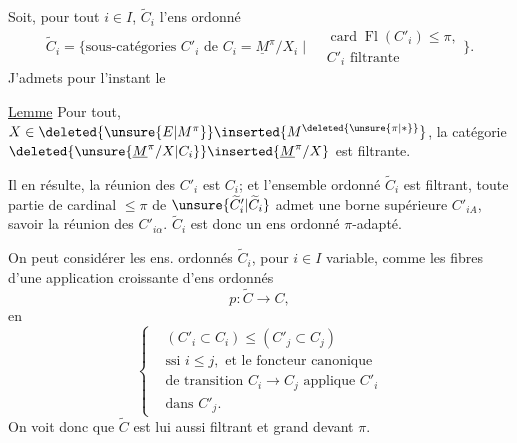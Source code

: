 Soit, pour tout $i\in I$, $\widetilde C_i$ l'ens ordonné
\[
\widetilde C_i=\{\text{sous-catégories }C'_i\text{ de }C_i=\underline M^{\pi}/X_i\mid
\begin{aligned}
&\operatorname{card}\operatorname{Fl}(C'_i)\leq\pi,\\
&C'_i\text{ filtrante}
\end{aligned}\}.
\]
J'admets pour l'instant le

\uline{Lemme} Pour  tout, $X\in\deleted{\unsure{E|M^{\pi}}}\inserted{M^{\deleted{\unsure{\pi|\ast}}}}$, la catégorie $\deleted{\unsure{\underline M^{\pi}/X|C_i}}\inserted{\underline M^{\pi}/X}$ est filtrante.

Il en résulte,  la réunion des $C'_i$  est $C_i$; et l'ensemble ordonné $\widetilde C_i$ est filtrant,  toute partie  de cardinal $\leq\pi$ de $\unsure{\widetilde C'_i|\widetilde C_i}$ admet une borne supérieure $C'_{iA}$, savoir la réunion des $C'_{i\alpha}$. $\widetilde C_i$ est donc un ens ordonné $\pi$-adapté. 

On peut considérer les ens. ordonnés $\widetilde C_i$, pour $i\in I$ variable, comme les fibres d'une application croissante d'ens ordonnés
\[
p:\widetilde C\longrightarrow C,
\]
en  
\[
\left\{\begin{aligned}
&(C'_i\subset C_i)\leq(C'_j\subset C_j)\\
&\text{ssi }i\leq j,\text{ et le foncteur canonique}\\
&\text{de transition }C_i\longrightarrow C_j\text{ applique }C'_i\\
&\text{dans }C'_j.
\end{aligned}\right.
\]
On voit donc que $\widetilde C$ est lui aussi filtrant et grand devant $\pi$.
